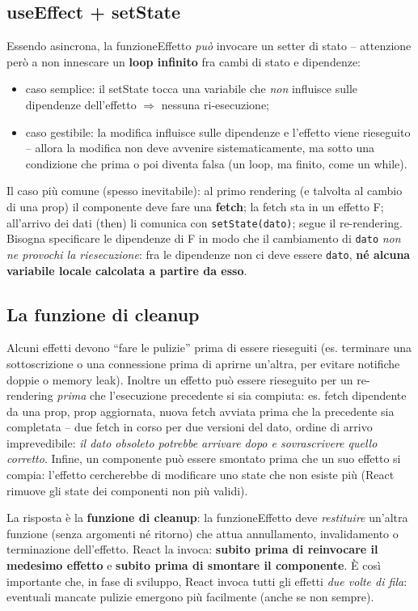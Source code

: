 \subsection{useEffect + setState}
Essendo asincrona, la funzioneEffetto \emph{pu\`o} invocare un setter di stato -- attenzione
per\`o a non innescare un \textbf{loop infinito} fra cambi di stato e dipendenze:
\begin{itemize}
  \item caso semplice: il setState tocca una variabile che \emph{non} influisce sulle
        dipendenze dell'effetto $\Rightarrow$ nessuna ri-esecuzione;
  \item caso gestibile: la modifica influisce sulle dipendenze e l'effetto viene rieseguito
        -- allora la modifica non deve avvenire sistematicamente, ma sotto una condizione che
        prima o poi diventa falsa (un loop, ma finito, come un while).
\end{itemize}
Il caso pi\`u comune (spesso inevitabile): al primo rendering (e talvolta al cambio di una
prop) il componente deve fare una \textbf{fetch}; la fetch sta in un effetto F; all'arrivo
dei dati (then) li comunica con \texttt{setState(dato)}; segue il re-rendering. Bisogna
specificare le dipendenze di F in modo che il cambiamento di \texttt{dato} \emph{non ne
provochi la riesecuzione}: fra le dipendenze non ci deve essere \texttt{dato}, \textbf{n\'e
alcuna variabile locale calcolata a partire da esso}.

\subsection{La funzione di cleanup}
Alcuni effetti devono ``fare le pulizie'' prima di essere rieseguiti (es. terminare una
sottoscrizione o una connessione prima di aprirne un'altra, per evitare notifiche doppie o
memory leak). Inoltre un effetto pu\`o essere rieseguito per un re-rendering \emph{prima}
che l'esecuzione precedente si sia compiuta: es. fetch dipendente da una prop, prop
aggiornata, nuova fetch avviata prima che la precedente sia completata -- due fetch in corso
per due versioni del dato, ordine di arrivo imprevedibile: \emph{il dato obsoleto potrebbe
arrivare dopo e sovrascrivere quello corretto}. Infine, un componente pu\`o essere smontato
prima che un suo effetto si compia: l'effetto cercherebbe di modificare uno state che non
esiste pi\`u (React rimuove gli state dei componenti non pi\`u validi).

\begin{importante}[Cleanup]
La risposta \`e la \textbf{funzione di cleanup}: la funzioneEffetto deve \emph{restituire}
un'altra funzione (senza argomenti n\'e ritorno) che attua annullamento, invalidamento o
terminazione dell'effetto. React la invoca: \textbf{subito prima di reinvocare il medesimo
effetto} e \textbf{subito prima di smontare il componente}. \`E cos\`i importante che, in
fase di sviluppo, React invoca tutti gli effetti \emph{due volte di fila}: eventuali mancate
pulizie emergono pi\`u facilmente (anche se non sempre).
\end{importante}
